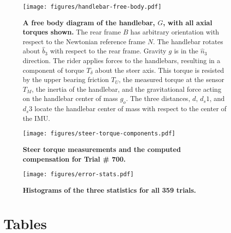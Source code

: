 \documentclass[10pt]{article}
\begin{document}
\begin{figure}[!ht]
  \centering
  \texttt{[image: figures/handlebar-free-body.pdf]}
  \caption{{\bf A free body diagram of the handlebar, $G$, with all axial torques
    shown.} The rear frame $B$ has arbitrary orientation with respect to the
    Newtonian reference frame $N$. The handlebar rotates about $\hat{b}_3$ with
    respect to the rear frame. Gravity $g$ is in the $\hat{n}_3$ direction. The
    rider applies forces to the handlebars, resulting in a component of torque
    $T_\delta$ about the steer axis. This torque is resisted by the upper
    bearing friction $T_U$, the measured torque at the sensor $T_M$, the
    inertia of the handlebar, and the gravitational force acting on the
    handlebar center of mass $g_o$. The three distances, $d$, $d_s1$, and
    $d_s3$ locate the handlebar center of mass with respect to the center of
    the IMU.}
  \label{fig:handlebar-free-body}
\end{figure}

\begin{figure}[!ht]
  \centering
  \texttt{[image: figures/steer-torque-components.pdf]}
  \caption{{\bf Steer torque measurements and the computed compensation for Trial \#
    700.}}
  \label{fig:steer-torque-components}
\end{figure}

\begin{figure}[!ht]
  \centering
  \texttt{[image: figures/error-stats.pdf]}
  \caption{{\bf Histograms of the three statistics for all 359 trials.}}
  \label{fig:error-stats}
\end{figure}

\section*{Tables}
\end{document}
